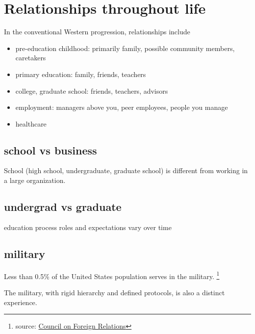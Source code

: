 \section{Relationships throughout life}
In the conventional Western progression, relationships include
\begin{itemize}
    \item pre-education childhood: primarily family, possible community members, caretakers
    \item primary education: family, friends, teachers
    \item college, graduate school: friends, teachers, advisors
    \item employment: managers above you, peer employees, people you manage
    \item healthcare
\end{itemize}

\subsection{school vs business}
School (high school, undergraduate, graduate school) is  different from working in a large organization. 


\subsection{undergrad vs graduate}
 education process roles and expectations vary over time

\subsection{military}
Less than 0.5\% of the United States population serves in the military. \footnote{source: \href{https://www.cfr.org/backgrounder/demographics-us-military}{Council on Foreign Relations}}

The military, with rigid hierarchy and defined protocols, is also a distinct experience. 
